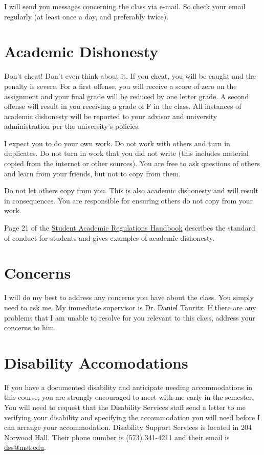 \documentclass{article}
\begin{document}
I will send you messages concerning the class via e-mail.
So check your email regularly (at least once a day, and preferably twice).

\section{Academic Dishonesty}
Don't cheat! Don't even think about it.
If you cheat, you will be caught and the penalty is severe.
For a first offense, you will receive a score of zero on the assignment and your final grade will be reduced by one letter grade.
A second offense will result in you receiving a grade of F in the class.
All instances of academic dishonesty will be reported to your advisor and university administration per the university's policies.

I expect you to do your own work.
Do not work with others and turn in duplicates.
Do not turn in work that you did not write (this includes material copied from the internet or other sources).
You are free to ask questions of others and learn from your friends, but not to copy from them.

Do not let others copy from you.
This is also academic dishonesty and will result in consequences.
You are responsible for ensuring others do not copy from your work.

Page 21 of the \href{http://registrar.mst.edu/academicregs/index.html}{Student Academic Regulations Handbook} describes the standard of conduct for students and gives examples of academic dishonesty.

\section{Concerns}
I will do my best to address any concerns you have about the class.
You simply need to ask me.
My immediate supervisor is Dr. Daniel Tauritz. If there are any problems that I am unable to resolve for you relevant to this class, address your concerns to him.

\section{Disability Accomodations}
If you have a documented disability and anticipate needing accommodations in this course, you are strongly encouraged to meet with me early in the semester.
You will need to request that the Disability Services staff send a letter to me verifying your disability and specifying the accommodation you will need before I can arrange your accommodation.
Disability Support Services is located in 204 Norwood Hall.
Their phone number is (573) 341-4211 and their email is \href{mailto:dss@mst.edu}{dss@mst.edu}.
\end{document}
